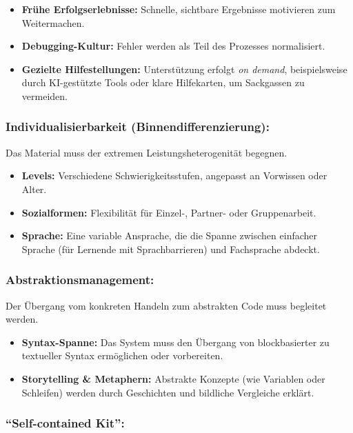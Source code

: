 \documentclass[a5paper,pagesize,10pt,bibtotoc,pointlessnumbers,
normalheadings,DIV=9,twoside=false]{scrbook}
\begin{document}
\begin{itemize}
    \item \textbf{Frühe Erfolgserlebnisse:} Schnelle, sichtbare Ergebnisse motivieren zum Weitermachen.
    \item \textbf{Debugging-Kultur:} Fehler werden als Teil des Prozesses normalisiert.
    \item \textbf{Gezielte Hilfestellungen:} Unterstützung erfolgt \textit{on demand}, beispielsweise durch KI-gestützte Tools oder klare Hilfekarten, um Sackgassen zu vermeiden.
\end{itemize}

\subsubsection{Individualisierbarkeit (Binnendifferenzierung):}
    
Das Material muss der extremen Leistungsheterogenität begegnen.

\begin{itemize}
    \item \textbf{Levels:} Verschiedene Schwierigkeitsstufen, angepasst an Vorwissen oder Alter.
    \item \textbf{Sozialformen:} Flexibilität für Einzel-, Partner- oder Gruppenarbeit.
    \item \textbf{Sprache:} Eine variable Ansprache, die die Spanne zwischen einfacher Sprache (für Lernende mit Sprachbarrieren) und Fachsprache abdeckt.
\end{itemize}

\subsubsection{Abstraktionsmanagement:}

Der Übergang vom konkreten Handeln zum abstrakten Code muss begleitet werden.

\begin{itemize}
    \item \textbf{Syntax-Spanne:} Das System muss den Übergang von blockbasierter zu textueller Syntax ermöglichen oder vorbereiten.
    \item \textbf{Storytelling \& Metaphern:} Abstrakte Konzepte (wie Variablen oder Schleifen) werden durch Geschichten und bildliche Vergleiche erklärt.
\end{itemize}    

\subsubsection{``Self-contained Kit'':}
    
\end{document}
